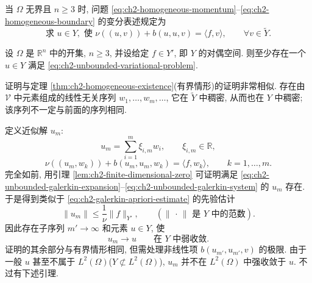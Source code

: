 当 $\Omega$ 无界且 $n\geq3$ 时, 问题 \eqref{eq:ch2-homogeneous-momentum}--\eqref{eq:ch2-homogeneous-boundary} 的变分表述规定为
\begin{equation}
\text{求 }u\in Y,\text{ 使 }\nu((u,v))+b(u,u,v)=\langle f,v\rangle,
\qquad\forall v\in\widetilde Y.
\label{eq:ch2-unbounded-variational-problem}
\end{equation}

\begin{Theorem}
\label{thm:ch2-unbounded-existence}
设 $\Omega$ 是 $\mathbb R^n$ 中的开集, $n\geq3$, 并设给定 $f\in Y'$, 即 $Y$ 的对偶空间. 则至少存在一个 $u\in Y$ 满足 \eqref{eq:ch2-unbounded-variational-problem}.
\end{Theorem}

\begin{Proof}
证明与定理 \ref{thm:ch2-homogeneous-existence}(有界情形)的证明非常相似. 存在由 $\mathcal V$ 中元素组成的线性无关序列 $w_1,\ldots,w_m,\ldots$, 它在 $\widetilde Y$ 中稠密, 从而也在 $Y$ 中稠密; 该序列不一定与前面的序列相同.

\hypertarget{chapter-02-page-129}{}
定义近似解 $u_m$:
\begin{equation}
u_m=\sum_{i=1}^{m}\xi_{i,m}w_i,
\qquad\xi_{i,m}\in\mathbb R,
\label{eq:ch2-unbounded-galerkin-expansion}
\end{equation}
\begin{equation}
\nu((u_m,w_k))+b(u_m,u_m,w_k)=\langle f,w_k\rangle,
\qquad k=1,\ldots,m.
\label{eq:ch2-unbounded-galerkin-system}
\end{equation}
完全如前, 用引理 \ref{lem:ch2-finite-dimensional-zero} 可证明满足 \eqref{eq:ch2-unbounded-galerkin-expansion}--\eqref{eq:ch2-unbounded-galerkin-system} 的 $u_m$ 存在. 于是得到类似于 \eqref{eq:ch2-galerkin-apriori-estimate} 的先验估计
\begin{equation}
\lVert u_m\rVert\leq\frac1\nu\lVert f\rVert_{Y'},
\qquad(\lVert\,\cdot\,\rVert\text{ 是 }Y\text{ 中的范数}).
\label{eq:ch2-unbounded-apriori-estimate}
\end{equation}
因此存在子序列 $m'\to\infty$ 和元素 $u\in Y$, 使
\begin{equation}
u_m\longrightarrow u\qquad\text{在 }Y\text{ 中弱收敛}.
\label{eq:ch2-unbounded-weak-convergence}
\end{equation}
证明的其余部分与有界情形相同, 但需处理非线性项 $b(u_{m'},u_{m'},v)$ 的极限. 由于一般 $u$ 甚至不属于 $L^2(\Omega)$($Y\not\subset L^2(\Omega)$), $u_m$ 并不在 $L^2(\Omega)$ 中强收敛于 $u$. 不过有下述引理.


\end{Proof}
